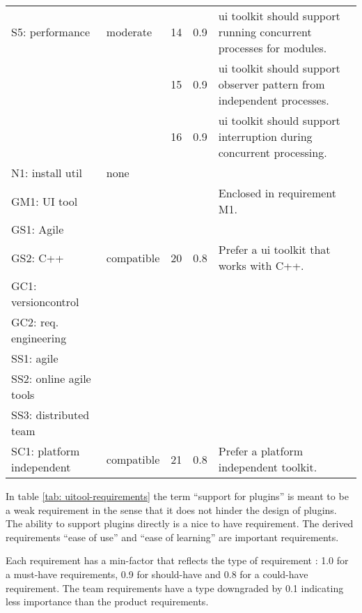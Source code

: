 \begin{center}
\begin{longtable}{ll||ccp{13em}}
        S5: performance	          & moderate     & 14  & 0.9 & ui toolkit should support running concurrent processes for modules.\\
	                          &              & 15  & 0.9 & ui toolkit should support observer pattern from independent processes.\\
	                          &              & 16  & 0.9 & ui toolkit should support interruption during concurrent processing.\\
        N1: install util          & none         &     &     & \\\hline
        GM1: UI tool	          &              &     &     & Enclosed in requirement M1.\\
        GS1: Agile	          &              &     &     & \\
        GS2: C++	          & compatible   & 20  & 0.8 & Prefer a ui toolkit that works with C++.\\
        GC1: versioncontrol       &              &     &     & \\
        GC2: req. engineering     &              &     &     & \\\hline
        SS1: agile	          &              &     &     & \\
        SS2: online agile tools   &              &     &     & \\
        SS3: distributed team     &              &     &     & \\
        SC1: platform independent & compatible	 & 21  & 0.8 & Prefer a platform independent toolkit.\\
    \end{longtable}
    \label{tab: uitool-requirements}
\end{center}

In table \ref{tab: uitool-requirements} the term ``support for plugins''
is meant to be a weak requirement in the sense that it does not hinder
the design of plugins. The ability to support plugins directly is a nice
to have requirement. The derived requirements ``ease of use'' and ``ease of
learning'' are important requirements.

Each requirement has a min-factor that reflects the type of requirement : 1.0 for a must-have requirements, 0.9 for should-have and 0.8
for a could-have requirement. The team requirements have a type downgraded by 0.1 indicating less importance than the product requirements.
